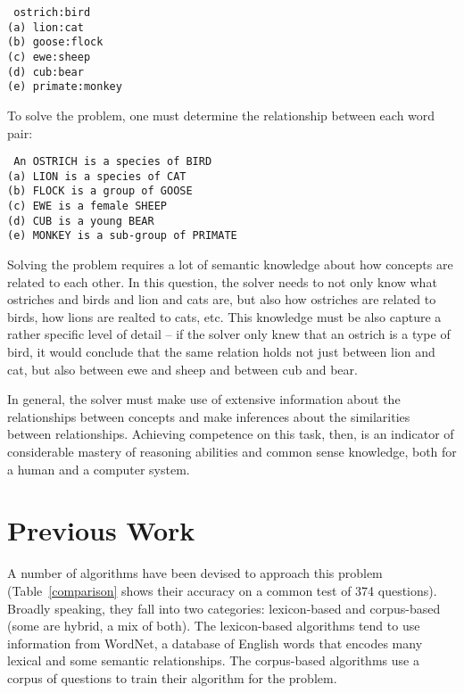 \documentclass[11pt]{article}
\begin{document}
\texttt{
ostrich:bird\\
(a) lion:cat\\
(b) goose:flock\\
(c) ewe:sheep\\
(d) cub:bear\\
(e) primate:monkey}

To solve the problem, one must determine the relationship between each word pair:

\texttt{
An OSTRICH is a species of BIRD\\
(a) LION is a species of CAT\\
(b) FLOCK is a group of GOOSE\\
(c) EWE is a female SHEEP\\
(d) CUB is a young BEAR\\
(e) MONKEY is a  sub-group of PRIMATE}

Solving the problem requires a lot of semantic knowledge about how concepts are related to each other. In this question, the solver needs to not only know what ostriches and birds and lion and cats are, but also how ostriches are related to birds, how lions are realted to cats, etc. This knowledge must be also capture a rather specific level of detail -- if the solver only knew that an ostrich is a type of bird, it would conclude that the same relation holds not just between lion and cat, but also between ewe and sheep and between cub and bear.

In general, the solver must make use of extensive information about the relationships between concepts and make inferences about the similarities between relationships. Achieving competence on this task, then, is an indicator of considerable mastery of reasoning abilities and common sense knowledge, both for a human and a computer system.

\section{Previous Work}

A number of algorithms have been devised to approach this problem (Table~\ref{comparison} shows their accuracy on a common test of 374 questions). Broadly speaking, they fall into two categories: lexicon-based and corpus-based (some are hybrid, a mix of both). The lexicon-based algorithms tend to use information from WordNet, a database of English words that encodes many lexical and some semantic relationships. The corpus-based algorithms use a corpus of questions to train their algorithm for the problem.
\end{document}
